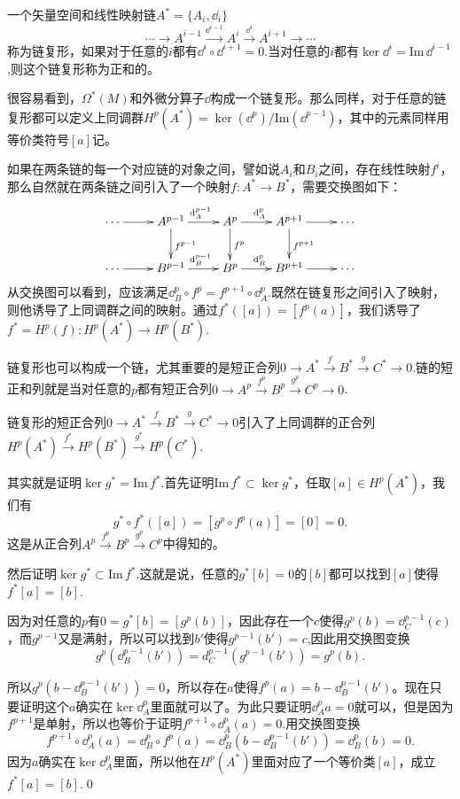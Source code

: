 \para 一个矢量空间和线性映射链$A^*=\{A_i,\dd_i\}$
\[
	\cdots\to A^{i-1}\xrightarrow{\dd^{i-1}}A^i\xrightarrow{\dd^i}A^{i+1}\to \cdots
\]
称为链复形，如果对于任意的$i$都有$\dd^i \circ \dd^{i+1}=0$.当对任意的$i$都有$\ker \dd^i=\mathrm{Im}\, \dd^{i-1}$,则这个链复形称为正和的。

\para 很容易看到，$\Omega^*(M)$和外微分算子$\dd$构成一个链复形。那么同样，对于任意的链复形都可以定义上同调群$H^p(A^*)=\ker (\dd^p)/\mathrm{Im} (\dd^{p-1})$，其中的元素同样用等价类符号$[a]$记。

\para 如果在两条链的每一个对应链的对象之间，譬如说$A_i$和$B_i$之间，存在线性映射$f^i$，那么自然就在两条链之间引入了一个映射$f:A^*\to B^*$，需要交换图如下：
	\[
	\xymatrix{
		\cdots\ar[r]&A^{p-1}\ar[r]^{\dd_A^{p-1}}\ar[d]^{f^{p-1}}&A^p\ar[r]^{\dd_A^p}\ar[d]^{f^{p}}&A^{p+1}\ar[r]\ar[d]^{f^{p+1}}&\cdots\\
		\cdots\ar[r]&B^{p-1}\ar[r]^{\dd_B^{p-1}}&B^p\ar[r]^{\dd_B^p}&B^{p+1}\ar[r]&\cdots
	}
	\]
从交换图可以看到，应该满足$\dd^{p}_B\circ f^p=f^{p+1}\circ \dd^{p}_A$.既然在链复形之间引入了映射，则他诱导了上同调群之间的映射。通过$f^*([a])=[f^p(a)]$，我们诱导了$f^*=H^p(f):H^p(A^*)\to H^p(B^*)$.

\para 链复形也可以构成一个链，尤其重要的是短正合列$0\to A^*\xrightarrow{f}B^*\xrightarrow{g}C^*\to 0$.链的短正和列就是当对任意的$p$都有短正合列$0\to A^p\xrightarrow{f^p}B^p\xrightarrow{g^p}C^p\to 0$.

\pro 链复形的短正合列$0\to A^*\xrightarrow{f}B^*\xrightarrow{g}C^*\to 0$引入了上同调群的正合列$H^p(A^*)\xrightarrow{f^*}H^p(B^*)\xrightarrow{g^*}H^p(C^*)$.

\proof 其实就是证明$\ker g^*=\mathrm{Im}\, f^*$.首先证明$\mathrm{Im}\, f^* \subset \ker g^*$，任取$[a]\in H^p(A^*)$，我们有
\[
g^*\circ f^*([a])=[g^p\circ f^p(a)]=[0]=0.
\]
这是从正合列$A^p\xrightarrow{f^p}B^p\xrightarrow{g^p}C^p$中得知的。

然后证明$\ker g^*\subset \mathrm{Im}\, f^*$.这就是说，任意的$g^*[b]=0$的$[b]$都可以找到$[a]$使得$f^*[a]=[b]$.

因为对任意的$p$有$0=g^*[b]=[g^p(b)]$，因此存在一个$c$使得$g^p(b)=\dd^{p-1}_C(c)$，而$g^{p-1}$又是满射，所以可以找到$b'$使得$g^{p-1}(b')=c$,因此用交换图变换
\[
g^p(\dd^{p-1}_B(b'))=d^{p-1}_C(g^{p-1}(b'))=g^p(b).
\]

所以$g^p(b-\dd^{p-1}_B(b'))=0$，所以存在$a$使得$f^p(a)=b-\dd^{p-1}_B(b')$。现在只要证明这个$a$确实在$\ker \dd^p_A$里面就可以了。为此只要证明$\dd^p_A a=0$就可以，但是因为$f^{p+1}$是单射，所以也等价于证明$f^{p+1}\circ \dd^p_A (a)=0$.用交换图变换
\[
f^{p+1}\circ \dd^p_A (a)=\dd^p_B\circ f^p (a)=\dd^p_B(b-\dd^{p-1}_B(b'))=\dd^p_B(b)=0.
\]
因为$a$确实在$\ker \dd^p_A$里面，所以他在$H^p(A^*)$里面对应了一个等价类$[a]$，成立$f^*[a]=[b]$.\qed

